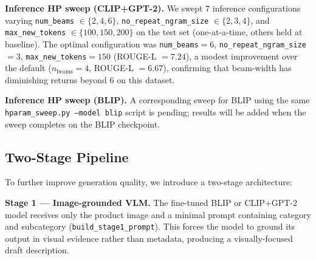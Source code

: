 \documentclass[12pt,a4paper]{article}
\begin{document}
\begin{table}[H]
\centering
\caption{Training LR sweep results (200-sample subset, 3 epochs). Lower val loss is better.}
\label{tab:training_sweep}
\end{table}

\textbf{Inference HP sweep (CLIP+GPT-2).} We swept 7 inference configurations
varying \texttt{num\_beams} $\in \{2, 4, 6\}$, \texttt{no\_repeat\_ngram\_size}
$\in \{2, 3, 4\}$, and \texttt{max\_new\_tokens} $\in \{100, 150, 200\}$ on the test set
(one-at-a-time, others held at baseline). The optimal configuration was
\texttt{num\_beams}$=6$, \texttt{no\_repeat\_ngram\_size}$=3$,
\texttt{max\_new\_tokens}$=150$ (ROUGE-L $= 7.24$), a modest improvement over the
default ($n_{\text{beams}}=4$, ROUGE-L $= 6.67$), confirming that beam-width has
diminishing returns beyond 6 on this dataset.

\textbf{Inference HP sweep (BLIP).} A corresponding sweep for BLIP using the same
\texttt{hparam\_sweep.py --model blip} script is pending; results will be added
when the sweep completes on the BLIP checkpoint.

\subsection{Two-Stage Pipeline}

To further improve generation quality, we introduce a two-stage architecture:

\textbf{Stage 1 --- Image-grounded VLM.} The fine-tuned BLIP or CLIP+GPT-2 model
receives only the product image and a minimal prompt containing category and subcategory
(\texttt{build\_stage1\_prompt}). This forces the model to ground its output in visual
evidence rather than metadata, producing a visually-focused draft description.
\end{document}
